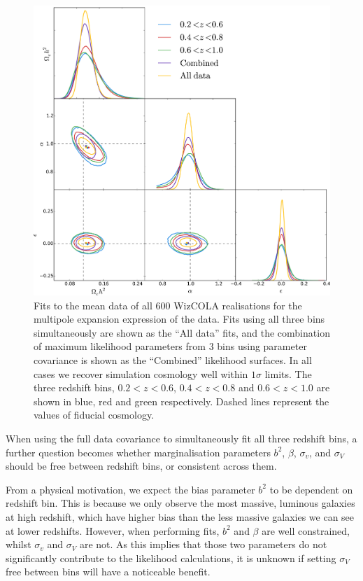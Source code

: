 \documentclass[a4paper,fleqn,usenatbib]{mnras}
\begin{document}
\begin{figure}
	\begin{center}
		\includegraphics[width=\columnwidth]{corCombinedMPWiz.png}
	\end{center}
	\caption{Fits to the mean data of all 600 WizCOLA realisations 
		for the multipole expansion expression of the data. Fits using all three bins simultaneously are shown as the ``All data'' fits, and the combination of maximum likelihood parameters from 3 bins using parameter covariance is shown as the ``Combined'' likelihood surfaces. In all cases we recover simulation cosmology well within $1\sigma$ limits. The three redshift bins, $0.2<z<0.6$, $0.4<z<0.8$ and $0.6<z<1.0$ are shown in blue, red and green respectively. Dashed lines represent the values of fiducial cosmology.}
	\label{fig:corCombinedMPWiz}
\end{figure}



When using the full data covariance to simultaneously fit all three redshift bins, a further question becomes whether marginalisation parameters $b^2$, $\beta$, $\sigma_v$, and $\sigma_V$ should be free between redshift bins, or consistent across them. 

From a physical motivation, we expect the bias parameter $b^2$ to be dependent on redshift bin. This is because we only observe the most massive, luminous galaxies at high redshift, which have higher bias than the less massive galaxies we can see at lower redshifts. However, when performing fits, $b^2$ and $\beta$ are well constrained, whilst $\sigma_v$ and $\sigma_V$ are not. As this implies that those two parameters do not significantly contribute to the likelihood calculations, it is unknown if setting $\sigma_V$ free between bins will have a noticeable benefit. 
\end{document}
